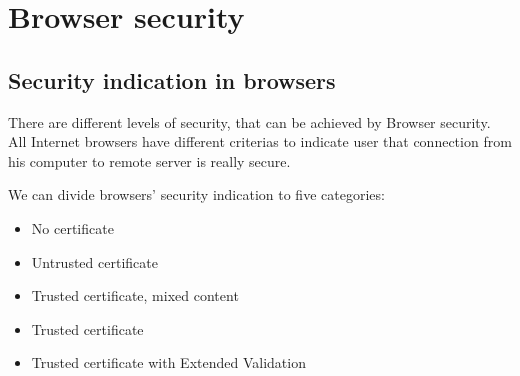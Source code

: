 \section{Browser security}



\subsection{Security indication in browsers}

There are different levels of security, that can be achieved by Browser security. All Internet browsers have different criterias to indicate user that connection from his computer to remote server is really secure.

We can divide browsers' security indication to five categories:

\begin{itemize}
  \item No certificate
  \item Untrusted certificate
  \item Trusted certificate, mixed content
  \item Trusted certificate
  \item Trusted certificate with Extended Validation
\end{itemize}


